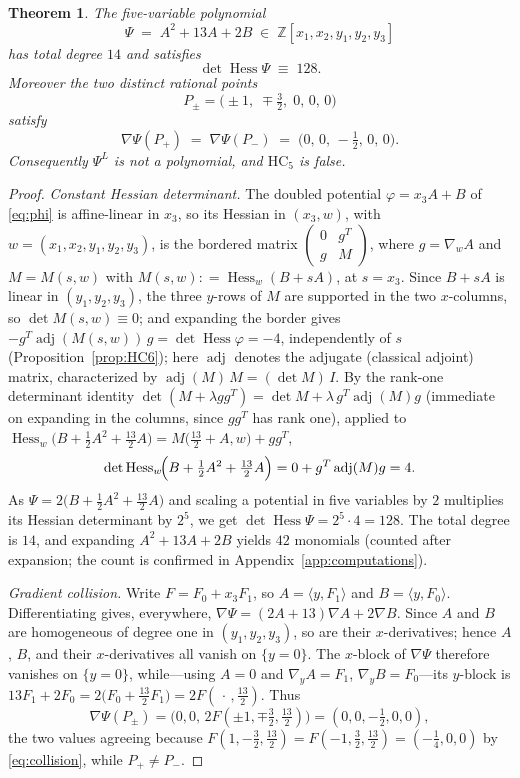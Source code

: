 \documentclass[11pt]{article}
\theoremstyle{plain}
\newtheorem{theorem}{Theorem}[section]
\theoremstyle{definition}
\newcommand{\HC}{\mathrm{HC}}
\newcommand{\Hess}{\operatorname{Hess}}
\newcommand{\adj}{\operatorname{adj}}
\providecommand{\coloneqq}{\mathrel{\mathop:}=}
\begin{document}
\begin{theorem}\label{thm:psi5}
The five-variable polynomial
\[
\Psi\;=\;A^2+13A+2B\;\in\;
\mathbb{Z}[x_1,x_2,y_1,y_2,y_3]
\]
has total degree $14$ and satisfies
\[
\det\Hess\Psi\;\equiv\;128 .
\]
Moreover the two distinct rational points
\[
P_{\pm}=\bigl(\pm1,\;\mp\tfrac32,\;0,\,0,\,0\bigr)
\]
satisfy
\[
\nabla\Psi(P_+)\;=\;
\nabla\Psi(P_-)\;=\;
\bigl(0,\,0,\,-\tfrac12,\,0,\,0\bigr).
\]
Consequently $\Psi^{L}$ is not a polynomial, and $\HC_5$ is false.
\end{theorem}

\begin{proof}
\emph{Constant Hessian determinant.} The doubled potential
$\varphi=x_3A+B$ of \eqref{eq:phi} is affine-linear in $x_3$, so its
Hessian in $(x_3,w)$, with $w=(x_1,x_2,y_1,y_2,y_3)$, is the bordered
matrix $\left(\begin{smallmatrix}0&g^{T}\\ g&M\end{smallmatrix}\right)$,
where $g=\nabla_wA$ and $M=M(s,w)$ with
$M(s,w)\coloneqq\Hess_w(B+sA)$, at $s=x_3$. Since
$B+sA$ is linear in $(y_1,y_2,y_3)$, the three $y$-rows of $M$ are
supported in the two $x$-columns, so $\det M(s,w)\equiv0$; and expanding
the border gives $-g^{T}\adj(M(s,w))\,g=\det\Hess\varphi=-4$,
independently of $s$ (Proposition~\ref{prop:HC6}); here $\adj$ denotes the
adjugate (classical adjoint) matrix, characterized by
$\adj(M)\,M=(\det M)\,I$. By the rank-one
determinant identity
$\det(M+\lambda gg^{T})=\det M+\lambda\,g^{T}\adj(M)g$
(immediate on expanding in the columns, since $gg^{T}$ has rank one), applied to
$\Hess_w\bigl(B+\tfrac12A^2+\tfrac{13}2A\bigr)=M\bigl(\tfrac{13}2+A,w\bigr)+gg^{T}$,
\[
\det\Hess_w\!\Bigl(B+\tfrac12A^2+\tfrac{13}2A\Bigr)
=0+g^{T}\adj(M)g=4 .
\]
As $\Psi=2\bigl(B+\tfrac12A^2+\tfrac{13}2A\bigr)$ and scaling a
potential in five variables by $2$ multiplies its Hessian determinant by
$2^{5}$, we get $\det\Hess\Psi=2^{5}\cdot4=128$. The total degree is
$14$, and expanding $A^2+13A+2B$ yields $42$ monomials (counted after
expansion; the count is confirmed in Appendix~\ref{app:computations}).

\emph{Gradient collision.} Write $F=F_0+x_3F_1$, so $A=\langle y,F_1\rangle$
and $B=\langle y,F_0\rangle$. Differentiating gives, everywhere,
$\nabla\Psi=(2A+13)\nabla A+2\nabla B$. Since $A$ and $B$ are
homogeneous of degree one in $(y_1,y_2,y_3)$, so are their
$x$-derivatives; hence $A$, $B$, and their $x$-derivatives all vanish on
$\{y=0\}$. The $x$-block of $\nabla\Psi$ therefore vanishes on
$\{y=0\}$, while---using
$A=0$ and $\nabla_yA=F_1$, $\nabla_yB=F_0$---its $y$-block is
$13F_1+2F_0=2\bigl(F_0+\tfrac{13}2F_1\bigr)
=2F(\,\cdot\,,\tfrac{13}2)$. Thus
\[
\nabla\Psi(P_\pm)
=\bigl(0,0,\,2F(\pm1,\mp\tfrac32,\tfrac{13}2)\bigr)
=(0,0,-\tfrac12,0,0),
\]
the two values agreeing because
$F(1,-\tfrac32,\tfrac{13}2)=F(-1,\tfrac32,\tfrac{13}2)=(-\tfrac14,0,0)$
by \eqref{eq:collision}, while $P_+\ne P_-$.


\end{proof}
\end{document}
